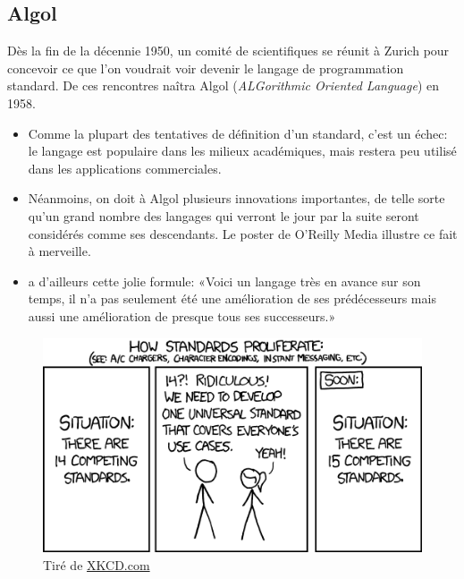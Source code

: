 \subsection{Algol}
\label{sec:informatique:historique:algol}

Dès la fin de la décennie 1950, un comité de scientifiques se réunit à
Zurich pour concevoir ce que l'on voudrait voir devenir le langage de
programmation standard. De ces rencontres naîtra Algol
(\emph{ALGorithmic Oriented Language}) en 1958.
\begin{itemize}
\item Comme la plupart des tentatives de définition d'un standard,
  c'est un échec: le langage est populaire dans les milieux
  académiques, mais restera peu utilisé dans les applications
  commerciales.
\item Néanmoins, on doit à Algol plusieurs innovations importantes, de
  telle sorte qu'un grand nombre des langages qui verront le jour par
  la suite seront considérés comme ses descendants. Le poster
   de O'Reilly Media illustre ce fait à
  merveille.
\item \citet{Hoare:1973} a d'ailleurs cette jolie formule: «Voici un
  langage très en avance sur son temps, il n'a pas seulement été une
  amélioration de ses prédécesseurs mais aussi une amélioration de
  presque tous ses successeurs.»
\end{itemize}

\begin{figure}[t]
  \centering
  \begin{minipage}{0.9\linewidth}
    \includegraphics{standards} \\
    \footnotesize\sffamily%
    Tiré de \href{http://xkcd.com/927/}{XKCD.com}
  \end{minipage}
\end{figure}

